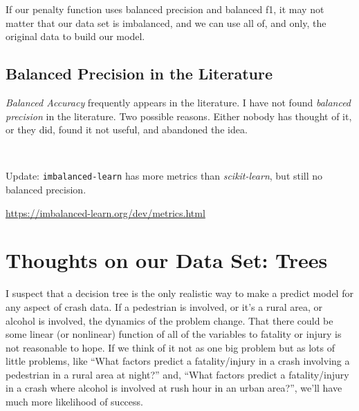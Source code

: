 \documentclass[11pt]{article}
\begin{document}
\begin{spacing}{1.2}
If our penalty function uses balanced precision and balanced f1, it may not matter that our data set is imbalanced, and we can use all of, and only, the original data to build our model.  

\subsection{Balanced Precision in the Literature}

{\it Balanced Accuracy} frequently appears in the literature.  I have not found {\it balanced precision} in the literature.  Two possible reasons.  Either nobody has thought of it, or they did, found it not useful, and abandoned the idea.

\

Update:  {\tt imbalanced-learn} has more metrics than {\it scikit-learn}, but still no balanced precision.  

\url{https://imbalanced-learn.org/dev/metrics.html}


\section{Thoughts on our Data Set:  Trees}

I suspect that a decision tree is the only realistic way to make a predict model for any aspect of crash data.  If a pedestrian is involved, or it's a rural area, or alcohol is involved, the dynamics of the problem change.  That there could be some linear (or nonlinear) function of all of the variables to fatality or injury is not reasonable to hope.  If we think of it not as one big problem but as lots of little problems, like ``What factors predict a fatality/injury in a crash involving a pedestrian in a rural area at night?'' and, ``What factors predict a fatality/injury in a crash where alcohol is involved at rush hour in an urban area?'',  we'll have much more likelihood of success.  



\clearpage
{}
\printindex

\end{spacing}
\end{document}
